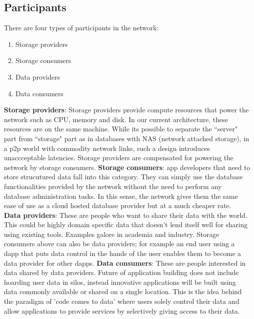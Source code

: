 \subsection{Participants} \label{sec:participants}
There are four types of participants in the network:
\begin{enumerate}
	\item Storage providers
	\item Storage consumers
	\item Data providers
	\item Data consumers \newline
\end{enumerate}
\textbf{Storage providers}: Storage providers provide compute resources that power the network such as CPU, memory and disk. In our current architecture, these resources are on the same machine. While its possible to separate the ``server" part from ``storage" part as in databases with NAS (network attached storage), in a p2p world with commodity network links, such a design introduces unaccceptable latencies. Storage providers are compensated for powering the network by storage consumers. 
\newline\newline
\textbf{Storage consumers}: \DJ app developers that need to store strucutured data fall into this category. They can simply use the database functionalities provided by the network without the need to perform any database administration tasks. In this sense, the network gives them the same ease of use as a cloud hosted database provider but at a much cheaper rate.
\newline\newline
\textbf{Data providers}: These are people who want to share their data with the world. This could be highly domain specific data that doesn't lend itself well for sharing using existing tools. Examples galore in academia and industry. Storage consumers above can also be data providers; for example an end user using a dapp that puts data control in the hands of the user enables them to become a data provider for other dapps.
\newline\newline
\textbf{Data consumers}: These are people interested in data shared by data providers. Future of application building does not include hoarding user data in silos, instead innovative applications will be built using data commonly available or shared on a single location. This is the idea behind the paradigm of 'code comes to data' where users solely control their data and allow applications to provide services by selectively giving access to their data.


